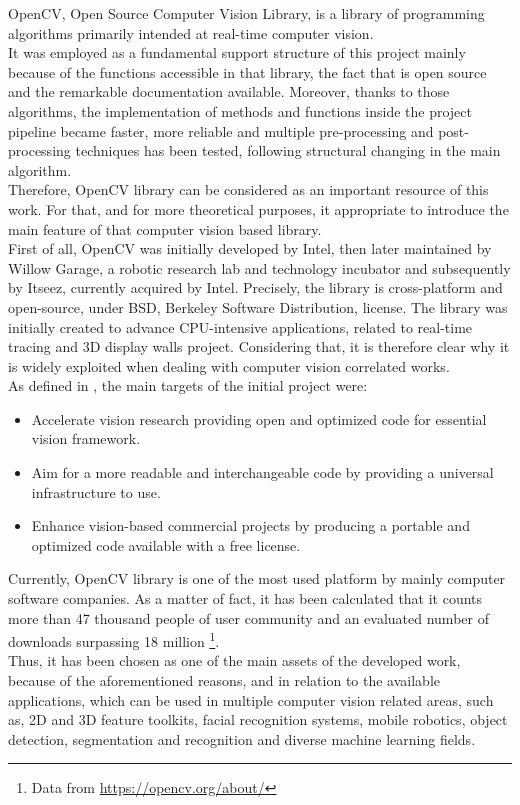 OpenCV, Open Source Computer Vision Library, is a library of programming algorithms primarily intended at real-time computer vision.\\
It was employed as a fundamental support structure of this project mainly because of the functions accessible in that library, the fact that is open source and the remarkable documentation available. 
Moreover, thanks to those algorithms, the implementation of methods and functions inside the project pipeline became faster, more reliable and multiple pre-processing and post-processing techniques has been tested, following structural changing in the main algorithm.\\
Therefore, OpenCV library can be considered as an important resource of this work.
For that, and for more theoretical purposes, it appropriate to introduce the main feature of that computer vision based library.\\
First of all, OpenCV was initially developed by Intel, then later maintained by Willow Garage, a robotic research lab and technology incubator and subsequently by Itseez, currently acquired by Intel.
Precisely, the library is cross-platform and open-source, under BSD, Berkeley Software Distribution, license. 
The library was initially created to advance CPU-intensive applications, related to real-time tracing and 3D display walls project.
Considering that, it is therefore clear why it is widely exploited when dealing with computer vision correlated works.\\
As defined in \cite{bradski2008learning}, the main targets of the initial project were:
\begin{itemize}
	\item Accelerate vision research providing open and optimized code for essential vision framework.
	\item Aim for a more readable and interchangeable code by providing a universal infrastructure to use.
	\item Enhance vision-based commercial projects by producing a portable and optimized code available with a free license.
\end{itemize}
Currently, OpenCV library is one of the most used platform by mainly computer software companies.
As a matter of fact, it has been calculated that it counts more than 47 thousand people of user community and an evaluated number of downloads surpassing 18 million \footnote{Data from \url{https://opencv.org/about/}}.\\
Thus, it has been chosen as one of the main assets of the developed work, because of the aforementioned reasons, and in relation to the available applications, which can be used in multiple computer vision related areas, such as, 2D and 3D feature toolkits, facial recognition systems, mobile robotics, object detection, segmentation and recognition and diverse machine learning fields.


